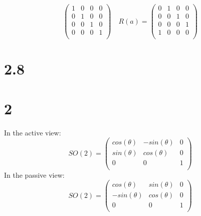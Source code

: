 \documentclass{article}
\begin{document}
\begin{CJK*}{GBK}{song}
\begin{equation}
\begin{pmatrix}
     1  &  0  &  0  &  0\\
     0  &  1  &  0  &  0\\
     0  &  0  &  1  &  0\\
     0  &  0  &  0  &  1\\
\end{pmatrix}\quad
R(a)=
\begin{pmatrix}
     0  &  1  &  0  &  0\\
     0  &  0  &  1  &  0\\
     0  &  0  &  0  &  1\\
     1  &  0  &  0  &  0\\
\end{pmatrix}
\end{equation}





\section{2.8}


\section{2}
In the active view:
\begin{equation}
SO(2)=
\begin{pmatrix}
     cos(\theta)  &  -sin(\theta)  &  0  \\
      sin(\theta)  &  cos(\theta)  &  0  \\
                    0  &                 0  &  1  \\
\end{pmatrix}
\end{equation}
In the passive view:
\begin{equation}
SO(2)=
\begin{pmatrix}
     cos(\theta)  &   sin(\theta)  &  0  \\
     -sin(\theta)  &  cos(\theta)  &  0  \\
                    0  &                 0  &  1  \\
\end{pmatrix}
\end{equation}



\end{CJK*}
\end{document}
